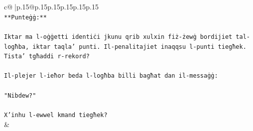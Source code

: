 \documentclass{article}
\begin{document}
{\begin{supertabular}{c@{$\;$}|p{.15\linewidth}@{}p{.15\linewidth}p{.15\linewidth}p{.15\linewidth}p{.15\linewidth}p{.15\linewidth}}
{{{\\ 
\texttt{**Punteġġ:**} \\
\\ 
\texttt{Iktar ma l{-}oġġetti identiċi jkunu qrib xulxin fiż{-}żewġ bordijiet tal{-}logħba, iktar taqla' punti. Il{-}penalitajiet inaqqsu l{-}punti tiegħek. Tista' tgħaddi r{-}rekord?} \\
\\ 
\texttt{Il{-}plejer l{-}ieħor beda l{-}logħba billi bagħat dan il{-}messaġġ:} \\
\\ 
\texttt{"Nibdew?"} \\
\\ 
\texttt{X'inhu l{-}ewwel kmand tiegħek?} \\
            }
        }
    }
    & \\ \\


\end{supertabular}}
\end{document}
